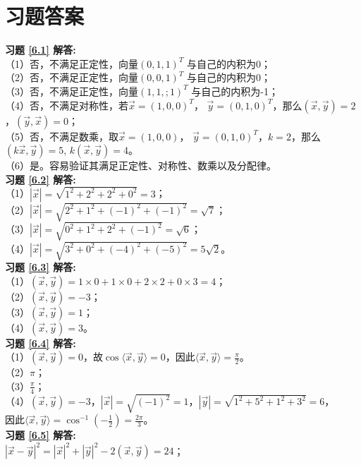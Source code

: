 \section{习题答案}
\textbf{习题 \ref{6.1} 解答:}\\
（1）否，不满足正定性，向量$(0,1,1)^T$ 与自己的内积为0；\\
（2）否，不满足正定性，向量$(0,0,1)^T$ 与自己的内积为0；\\
（3）否，不满足正定性，向量$(1,1,;1)^T$ 与自己的内积为-1；\\
（4）否，不满足对称性，若$\vec{x}=(1,0,0)^T$， $\vec{y}=(0,1,0)^T$，那么$(\vec{x},\vec{y})=2$，$(\vec{y},\vec{x})=0$；\\
（5）否，不满足数乘，取$\vec{x}=(1,0,0)$， $\vec{y}=(0,1,0)^T$，$k=2$，那么$(k\vec{x},\vec{y})=5$,
          $k(\vec{x},\vec{y})=4$。\\
（6）是。容易验证其满足正定性、对称性、数乘以及分配律。\\
\textbf{习题 \ref{6.2} 解答:}\\
（1）$|\vec{x}|=\sqrt{1^2+2^2+2^2+0^2}=3$；\\
（2）$|\vec{x}|=\sqrt{2^2+1^2+(-1)^2+(-1)^2}=\sqrt{7}$；\\
（3）$|\vec{x}|=\sqrt{0^2+1^2+2^2+(-1)^2}=\sqrt{6}$；\\
（4）$|\vec{x}|=\sqrt{3^2+0^2+(-4)^2+(-5)^2}=5\sqrt{2}$。\\
\textbf{习题 \ref{6.3} 解答:}\\
（1）$(\vec{x},\vec{y})=1\times0+1\times0+2\times2+0\times3=4$；\\
（2）$(\vec{x},\vec{y})=-3$；\\
（3）$(\vec{x},\vec{y})=1$；\\
（4）$(\vec{x},\vec{y})=3$。\\
\textbf{习题 \ref{6.4} 解答:}\\
（1）$(\vec{x},\vec{y})=0$，故$\cos\langle\vec{x},\vec{y}\rangle=0$，因此$\langle\vec{x},\vec{y}\rangle=\frac{\pi}{2}$。\\
（2）$\pi$；\\
（3）$\frac{\pi}{4}$；\\
（4）$(\vec{x},\vec{y})=-3$，$|\vec{x}|=\sqrt{(-1)^2}=1$，$|\vec{y}|=\sqrt{1^2+5^2+1^2+3^2}=6$，\\
     因此$\langle\vec{x},\vec{y}\rangle=\cos^{-1}(-\frac{1}{2})=\frac{2\pi}{3}$。\\
\textbf{习题 \ref{6.5} 解答:}\\
$|\vec{x}-\vec{y}|^2=|\vec{x}|^2+|\vec{y}|^2-2(\vec{x},\vec{y})=24$；\\
